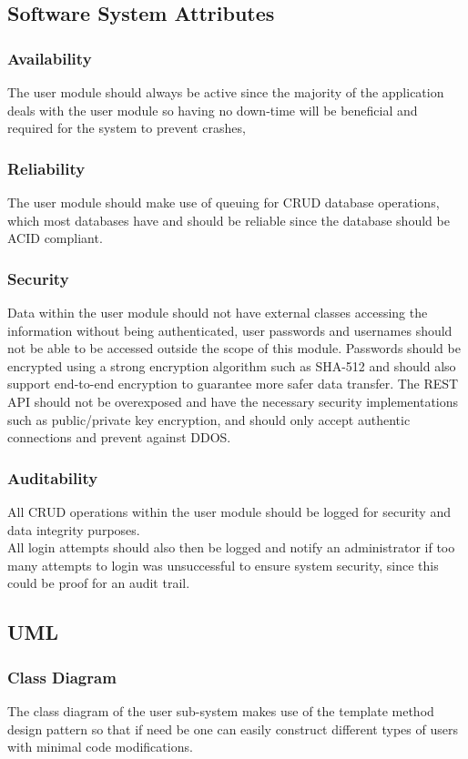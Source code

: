 \subsection{Software System Attributes} %
\subsubsection{Availability}
The user module should always be active since the majority of the application deals with the user module so having no down-time will be beneficial and required for the system to prevent crashes,
\subsubsection{Reliability}
The user module should make use of queuing for CRUD database operations, which most databases have and should be reliable since the database should be ACID compliant.

\subsubsection{Security}
Data within the user module should not have external classes accessing the information without being authenticated, user passwords and usernames should not be able to be accessed outside the scope of this module. Passwords should be encrypted using a strong encryption algorithm such as SHA-512 and should also support end-to-end encryption to guarantee more safer data transfer. The REST API should not be overexposed and have the necessary security implementations such as public/private key encryption, and should only accept authentic connections and prevent against DDOS.

\subsubsection{Auditability}
All CRUD operations within the user module should be logged for security and data integrity purposes.\\
All login attempts should also then be logged and notify an administrator if too many attempts to login was unsuccessful to ensure system security, since this could be proof for an audit trail.

\pagebreak
\subsection{UML}
\subsubsection{Class Diagram}
The class diagram of the user sub-system makes use of the template method design pattern so that if need be one can easily construct different types of users with minimal code modifications.

